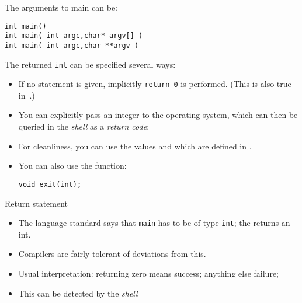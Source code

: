 The arguments to main can be:
\begin{lstlisting}
int main() 
int main( int argc,char* argv[] ) 
int main( int argc,char **argv ) 
\end{lstlisting}

The returned \lstinline{int} can be specified several ways:
\begin{itemize}
\item If no  statement is given,
  implicitly \lstinline+return 0+ is performed.
  (This is also true in~.)
\item You can explicitly pass an integer to the operating system,
  which can then be queried in the 
  \emph{shell} as a \emph{return code}:
\item For cleanliness, you can use the values
   and 
  which are defined in .
\item You can also use the  function:
\begin{lstlisting}
void exit(int);
\end{lstlisting}
\end{itemize}

\begin{slide}{Return statement}
  \label{sl:main-int}
  \begin{itemize}
  \item The language standard says that \lstinline{main} has to be of type
    \lstinline{int}; the  returns an int.
  \item Compilers are fairly tolerant of deviations from this.
  \item Usual interpretation: returning zero means success; anything else failure;
  \item This  can be detected by the
    \emph{shell}
  \end{itemize}
\end{slide}

